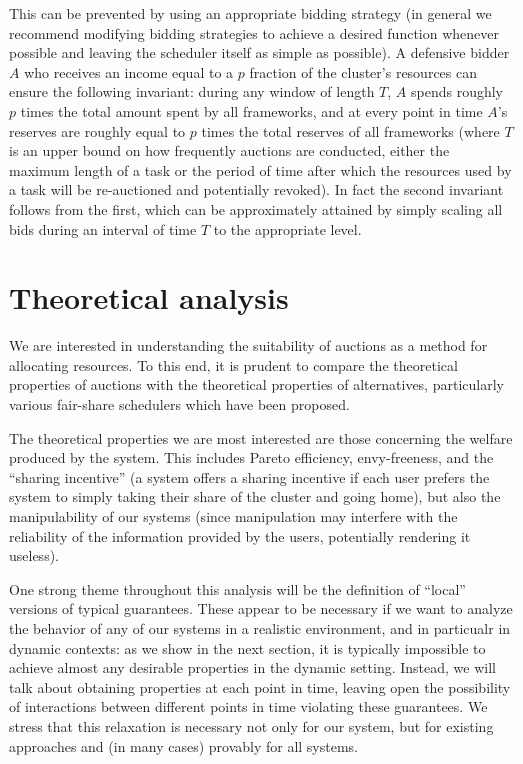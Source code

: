 \documentclass{acm_proc_article-sp}
\begin{document}
This can be prevented by using an appropriate bidding strategy
(in general we recommend modifying bidding strategies to achieve a desired
function whenever possible and leaving the scheduler itself as simple as possible).
A defensive bidder $A$ who receives an income equal to a $p$ fraction
of the cluster's resources can ensure the following invariant:
during any window of length $T$, $A$ spends roughly $p$ times the total amount
spent by all frameworks, and at every point in time $A$'s reserves are roughly equal to $p$
times the total reserves of all frameworks (where $T$ is an upper bound on how frequently auctions are conducted,
either the maximum length of a task or the period of time after which the resources used by a task
will be re-auctioned and potentially revoked).
In fact the second invariant follows from the first, which can be approximately attained
by simply scaling all bids during an interval of time $T$ to the appropriate level.

\section{Theoretical analysis}
\label{sec:theory}

We are interested in understanding the suitability of auctions
as a method for allocating resources.
To this end, it is prudent to compare the theoretical properties of auctions
with the theoretical properties of alternatives, particularly various fair-share
schedulers which have been proposed.

The theoretical properties we are most interested are those concerning the welfare
produced by the system.
This includes Pareto efficiency, envy-freeness, and the ``sharing incentive''
(a system offers a sharing incentive if each user prefers the system
to simply taking their share of the cluster and going home),
but also the manipulability of our systems
(since manipulation may interfere with the reliability of the information
provided by the users, potentially rendering it useless).

One strong theme throughout this analysis will be the definition of ``local'' versions
of typical guarantees.
These appear to be necessary if we want to analyze the behavior of any of our systems
in a realistic environment, and in particualr in dynamic contexts:
as we show in the next section, it is typically impossible to achieve
almost any desirable properties in the dynamic setting.
Instead, we will talk about obtaining properties at each point in time,
leaving open the possibility of interactions between different points in time
violating these guarantees.
We stress that this relaxation is necessary not only for our system,
but for existing approaches and (in many cases) provably for all systems.
\end{document}

